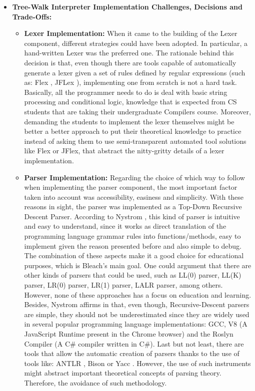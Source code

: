 \begin{itemize}
    \item \textbf{Tree-Walk Interpreter Implementation Challenges, Decisions and Trade-Offs:}
    \begin{itemize}
    
        \item \textbf{Lexer Implementation:} When it came to the building of the Lexer component, different strategies could have been adopted. In particular, a hand-written Lexer was the preferred one. The rationale behind this decision is that, even though there are tools capable of automatically generate a lexer given a set of rules defined by regular expressions (such as: Flex \cite{Flex} \cite{wiki_Flex}, JFLex \cite{klein2010jflex}), implementing one from scratch is not a hard task. Basically, all the programmer needs to do is deal with basic string processing and conditional logic, knowledge that is expected from CS students that are taking their undergraduate Compilers course. Moreover, demanding the students to implement the lexer themselves might be better a better approach to put their theoretical knowledge to practice instead of asking them to use semi-transparent automated tool solutions like Flex or JFlex, that abstract the nitty-gritty details of a lexer implementation.

        \item \textbf{Parser Implementation:} Regarding the choice of which way to follow when implementing the parser component, the most important factor taken into account was accessibility, easiness and simplicity. With these reasons in sight, the parser was implemented as a Top-Down Recursive Descent Parser. According to Nystrom \cite{nystrom2021crafting}, this kind of parser is intuitive and easy to understand, since it works as direct translation of the programming language grammar rules into functions/methods, easy to implement given the reason presented before and also simple to debug. The combination of these aspects make it a good choice for educational purposes, which is Bleach's main goal. One could argument that there are other kinds of parsers that could be used, such as LL(0) parser, LL(K) parser, LR(0) parser, LR(1) parser, LALR parser, among others. However, none of these approaches has a focus on education and learning. Besides, Nystrom affirms in \cite{nystrom2021crafting} that, even though, Recursive-Descent parsers are simple, they should not be underestimated since they are widely used in several popular programming language implementations: GCC, V8 (A JavaScript Runtime present in the Chrome browser) and the Roslyn Compiler (A C\# compiler written in C\#). Last but not least, there are tools that allow the automatic creation of parsers thanks to the use of tools like: ANTLR \cite{ANTLR}, Bison \cite{Bison} or Yacc \cite{johnson1975yacc} \cite{Yacc}. However, the use of such instruments might abstract important theoretical concepts of parsing theory. Therefore, the avoidance of such methodology.
        

\end{itemize}
\end{itemize}
